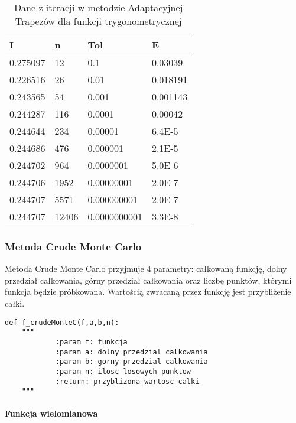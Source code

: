 \documentclass[12pt,twoside]{article}
\begin{document}
\begin{table}[H]
\centering 
\caption{Dane z iteracji w metodzie Adaptacyjnej Trapezów dla funkcji trygonometrycznej}
\label{tabela5.2}
\begin{tabular}{llll}
\toprule
I&  n &  Tol &      E \\
\midrule
0.275097 &  12  &   0.1 & 0.03039 \\
0.226516 &  26 &   0.01 & 0.018191 \\
0.243565 &  54  &  0.001 & 0.001143 \\
0.244287 &  116  &  0.0001  & 0.00042 \\
0.244644 &  234  &  0.00001  & 6.4E-5 \\
0.244686 &  476  &  0.000001  & 2.1E-5 \\
0.244702 &  964  &  0.0000001  & 5.0E-6 \\
0.244706 &  1952  &  0.00000001  & 2.0E-7 \\
0.244707 & 5571  &  0.000000001  & 2.0E-7 \\
0.244707 & 12406  & 0.0000000001  & 3.3E-8 \\

\bottomrule
\end{tabular}
\end{table}

\subsubsection{Metoda Crude Monte Carlo}

Metoda Crude Monte Carlo przyjmuje 4 parametry: całkowaną funkcję, dolny przedział całkowania, górny przedział całkowania oraz liczbę punktów, którymi funkcja będzie próbkowana. 
Wartością zwracaną przez funkcję jest przybliżenie całki.

\begin{lstlisting}[caption={Kod w języku python implementujący metodę Crude Monte Carlo}]
def f_crudeMonteC(f,a,b,n):
    """
    		:param f: funkcja
            :param a: dolny przedzial calkowania
            :param b: gorny przedzial calkowania
            :param n: ilosc losowych punktow
            :return: przyblizona wartosc calki
    """
\end{lstlisting}
\label{Listing 11}

\paragraph{Funkcja wielomianowa}\mbox{} \\
\end{document}
